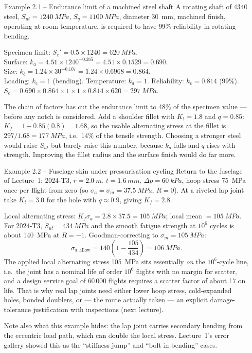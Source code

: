 \documentclass[11pt,a4paper]{article}
\begin{document}
\begin{examplebox}{Example 2.1 -- Endurance limit of a machined steel shaft}
A rotating shaft of 4340 steel, $S_{ut}=\SI{1240}{MPa}$, $S_y=\SI{1100}{MPa}$, diameter \SI{30}{mm}, machined finish, operating at room temperature, is required to have 99\% reliability in rotating bending.

Specimen limit: $S_e'=0.5\times1240=\SI{620}{MPa}$.\\
Surface: $k_a=4.51\times1240^{-0.265}=4.51\times0.1529=0.690$.\\
Size: $k_b=1.24\times30^{-0.107}=1.24\times0.6968=0.864$.\\
Loading: $k_c=1$ (bending). Temperature: $k_d=1$. Reliability: $k_e=0.814$ (99\%).\\
$S_e=0.690\times0.864\times1\times1\times0.814\times620=\SI{297}{MPa}$.

The chain of factors has cut the endurance limit to 48\% of the specimen value --- before any notch is considered. Add a shoulder fillet with $K_t=1.8$ and $q=0.85$: $K_f=1+0.85(0.8)=1.68$, so the usable alternating stress at the fillet is $297/1.68=\SI{177}{MPa}$, i.e.\ 14\% of the tensile strength. Choosing a stronger steel would raise $S_{ut}$ but barely raise this number, because $k_a$ falls and $q$ rises with strength. Improving the fillet radius and the surface finish would do far more.
\end{examplebox}

\begin{examplebox}{Example 2.2 -- Fuselage skin under pressurisation cycling}
Return to the fuselage of Lecture~1: 2024-T3, $r=\SI{2.0}{m}$, $t=\SI{1.6}{mm}$, $\Delta p=\SI{60}{kPa}$, hoop stress \SI{75}{MPa} once per flight from zero (so $\sigma_a=\sigma_m=\SI{37.5}{MPa}$, $R=0$). At a riveted lap joint take $K_t=3.0$ for the hole with $q\approx0.9$, giving $K_f=2.8$.

Local alternating stress: $K_f\sigma_a=2.8\times37.5=\SI{105}{MPa}$; local mean $=\SI{105}{MPa}$.\\
For 2024-T3, $S_{ut}=\SI{434}{MPa}$ and the smooth fatigue strength at $10^{6}$ cycles is about \SI{140}{MPa} at $R=-1$. Goodman-correcting to $\sigma_m=\SI{105}{MPa}$:
\[
\sigma_{a,\text{allow}}=140\left(1-\frac{105}{434}\right)=\SI{106}{MPa}.
\]
The applied local alternating stress \SI{105}{MPa} sits essentially \emph{on} the $10^{6}$-cycle line, i.e.\ the joint has a nominal life of order $10^{6}$ flights with no margin for scatter, and a design service goal of 60\,000 flights requires a scatter factor of about 17 on life. That is why real lap joints need either lower hoop stress, cold-expanded holes, bonded doublers, or --- the route actually taken --- an explicit damage-tolerance justification with inspections (next lecture).

Note also what this example hides: the lap joint carries secondary bending from the eccentric load path, which can double the local stress. Lecture~1's error gallery showed this as the ``stiffness jump'' and ``bolt in bending'' cases.
\end{examplebox}
\end{document}
